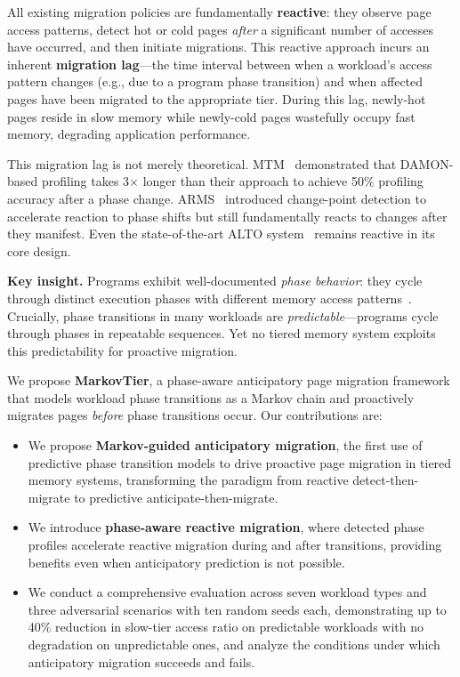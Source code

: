 \documentclass[preprint]{article}
\begin{document}
All existing migration policies are fundamentally \textbf{reactive}: they observe page access patterns, detect hot or cold pages \emph{after} a significant number of accesses have occurred, and then initiate migrations. This reactive approach incurs an inherent \textbf{migration lag}---the time interval between when a workload's access pattern changes (e.g., due to a program phase transition) and when affected pages have been migrated to the appropriate tier. During this lag, newly-hot pages reside in slow memory while newly-cold pages wastefully occupy fast memory, degrading application performance.

This migration lag is not merely theoretical. MTM~\citep{xu2024mtm} demonstrated that DAMON-based profiling takes 3$\times$ longer than their approach to achieve 50\% profiling accuracy after a phase change. ARMS~\citep{yadalam2025arms} introduced change-point detection to accelerate reaction to phase shifts but still fundamentally reacts to changes after they manifest. Even the state-of-the-art ALTO system~\citep{liu2025hotness} remains reactive in its core design.

\textbf{Key insight.} Programs exhibit well-documented \emph{phase behavior}: they cycle through distinct execution phases with different memory access patterns~\citep{sherwood2002simpoint, dhodapkar2002working}. Crucially, phase transitions in many workloads are \emph{predictable}---programs cycle through phases in repeatable sequences. Yet no tiered memory system exploits this predictability for proactive migration.

We propose \textbf{MarkovTier}, a phase-aware anticipatory page migration framework that models workload phase transitions as a Markov chain and proactively migrates pages \emph{before} phase transitions occur. Our contributions are:
\begin{itemize}
    \item We propose \textbf{Markov-guided anticipatory migration}, the first use of predictive phase transition models to drive proactive page migration in tiered memory systems, transforming the paradigm from reactive detect-then-migrate to predictive anticipate-then-migrate.
    \item We introduce \textbf{phase-aware reactive migration}, where detected phase profiles accelerate reactive migration during and after transitions, providing benefits even when anticipatory prediction is not possible.
    \item We conduct a comprehensive evaluation across seven workload types and three adversarial scenarios with ten random seeds each, demonstrating up to 40\% reduction in slow-tier access ratio on predictable workloads with no degradation on unpredictable ones, and analyze the conditions under which anticipatory migration succeeds and fails.
\end{itemize}
\end{document}
